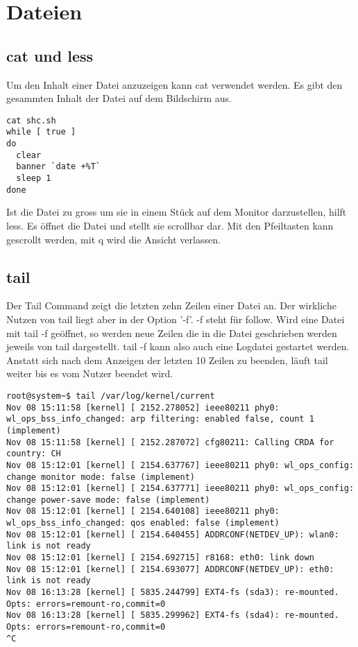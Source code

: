 \section{Dateien}
\subsection{cat und less}
Um den Inhalt einer Datei anzuzeigen kann cat verwendet werden. Es gibt den gesammten Inhalt der Datei auf dem Bildschirm aus.
\begin{lstlisting}[frame=single]
cat shc.sh
while [ true ]
do
  clear
  banner `date +%T`
  sleep 1
done
\end{lstlisting}
Ist die Datei zu gross um sie in einem St\"uck auf dem Monitor darzustellen, hilft less. Es \"offnet die Datei und stellt sie scrollbar dar. Mit den Pfeiltasten kann gescrollt werden, mit q wird die Ansicht verlassen.
\subsection{tail}
Der Tail Command zeigt die letzten zehn Zeilen einer Datei an. Der wirkliche Nutzen von tail liegt aber in der Option '-f'. -f steht f\"ur follow. Wird eine Datei mit tail -f ge\"offnet, so werden neue Zeilen die in die Datei geschrieben werden jeweils von tail dargestellt. tail -f kann also auch eine Logdatei gestartet werden. Anstatt sich nach dem Anzeigen der letzten 10 Zeilen zu beenden, l\"auft tail weiter bis es vom Nutzer beendet wird.
\begin{lstlisting}[frame=single]
root@system~$ tail /var/log/kernel/current
Nov 08 15:11:58 [kernel] [ 2152.278052] ieee80211 phy0: wl_ops_bss_info_changed: arp filtering: enabled false, count 1 (implement)
Nov 08 15:11:58 [kernel] [ 2152.287072] cfg80211: Calling CRDA for country: CH
Nov 08 15:12:01 [kernel] [ 2154.637767] ieee80211 phy0: wl_ops_config: change monitor mode: false (implement)
Nov 08 15:12:01 [kernel] [ 2154.637771] ieee80211 phy0: wl_ops_config: change power-save mode: false (implement)
Nov 08 15:12:01 [kernel] [ 2154.640108] ieee80211 phy0: wl_ops_bss_info_changed: qos enabled: false (implement)
Nov 08 15:12:01 [kernel] [ 2154.640455] ADDRCONF(NETDEV_UP): wlan0: link is not ready
Nov 08 15:12:01 [kernel] [ 2154.692715] r8168: eth0: link down
Nov 08 15:12:01 [kernel] [ 2154.693077] ADDRCONF(NETDEV_UP): eth0: link is not ready
Nov 08 16:13:28 [kernel] [ 5835.244799] EXT4-fs (sda3): re-mounted. Opts: errors=remount-ro,commit=0
Nov 08 16:13:28 [kernel] [ 5835.299962] EXT4-fs (sda4): re-mounted. Opts: errors=remount-ro,commit=0
^C
\end{lstlisting}
